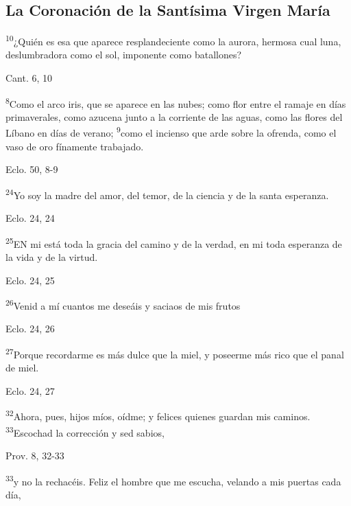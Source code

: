 \documentclass[a4paper,11pt]{article}
\begin{document}
    \subsection*{\hfil La Coronación de la Santísima Virgen María \hfil}
      \textsuperscript{10}¿Quién es esa que aparece resplandeciente como la aurora,
      hermosa cual luna, deslumbradora como el sol, imponente como batallones?
      \begin{flushright}
        Cant. 6, 10
      \end{flushright}      
      \textsuperscript{8}Como el arco iris, que se aparece en las nubes; como flor entre el ramaje en días primaverales, como azucena junto
      a la corriente de las aguas, como las flores del Líbano en días de verano; \textsuperscript{9}como el incienso que arde sobre la ofrenda,
      como el vaso de oro fínamente trabajado.
      \begin{flushright}
        Eclo. 50, 8-9
      \end{flushright}      
      \textsuperscript{24}Yo soy la madre del amor, del temor, de la ciencia y de la santa esperanza.
      \begin{flushright}
        Eclo. 24, 24
      \end{flushright}      
      \textsuperscript{25}EN mi está toda la gracia del camino y de la verdad, en mi toda esperanza de la vida y de la virtud.
      \begin{flushright}
        Eclo. 24, 25
      \end{flushright}      
      \textsuperscript{26}Venid a mí cuantos me deseáis y saciaos de mis frutos
      \begin{flushright}
        Eclo. 24, 26
      \end{flushright}      
      \textsuperscript{27}Porque recordarme es más dulce que la miel, y poseerme más rico que el panal de miel.
      \begin{flushright}
        Eclo. 24, 27
      \end{flushright}      
      \textsuperscript{32}Ahora, pues, hijos míos, oídme; y felices quienes guardan mis caminos. \textsuperscript{33}Escochad la corrección y sed sabios,
      \begin{flushright}
        Prov. 8, 32-33
      \end{flushright}      
      \textsuperscript{33}y no la rechacéis. Feliz el hombre que me escucha, velando a mis puertas cada día,
\end{document}
